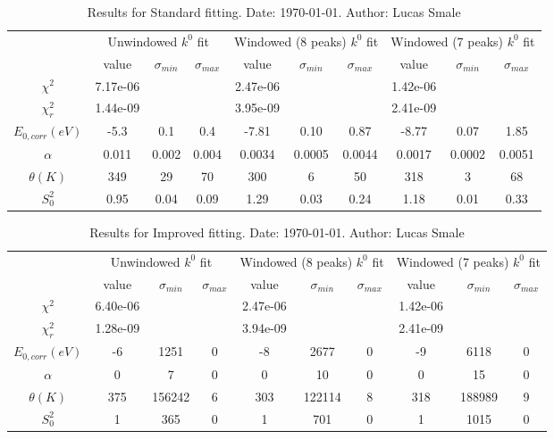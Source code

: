 \documentclass{article}
\begin{document}
\begin{landscape}
\begin{table}[ht]
\centering
\begin{tabular}{c||c|c|c||c|c|c||c|c|c}
\hline
&\multicolumn{3}{|c}{Unwindowed $k^{0}$ fit}&\multicolumn{3}{|c}{Windowed (8 peaks) $k^{0}$ fit}&\multicolumn{3}{|c}{Windowed (7 peaks) $k^{0}$ fit}\\
& value & $\sigma_{min}$ & $\sigma_{max}$& value & $\sigma_{min}$ & $\sigma_{max}$& value & $\sigma_{min}$ & $\sigma_{max}$\\
\hline
$\chi^2$   & 7.17e-06 & & & 2.47e-06 & & & 1.42e-06 & & \\
$\chi^2_r$ & 1.44e-09 & & & 3.95e-09 & & & 2.41e-09 & & \\
\hline
$E_{0,corr} (eV)$& -5.3 & 0.1 & 0.4 & -7.81 & 0.10 & 0.87 & -8.77 & 0.07 & 1.85 \\
$\alpha $       & 0.011 & 0.002 & 0.004 & 0.0034 & 0.0005 & 0.0044 & 0.0017 & 0.0002 & 0.0051 \\
$\theta (K) $   & 349 & 29 & 70 & 300 & 6 & 50 & 318 & 3 & 68 \\
$S^2_{0}$& 0.95 & 0.04 & 0.09 & 1.29 & 0.03 & 0.24 & 1.18 & 0.01 & 0.33 \\
\hline
\end{tabular}
 \caption{Results for Standard fitting. Date: \today. Author: Lucas Smale}
\end{table}
\begin{table}[ht]
\centering
\begin{tabular}{c||c|c|c||c|c|c||c|c|c}
\hline
&\multicolumn{3}{|c}{Unwindowed $k^{0}$ fit}&\multicolumn{3}{|c}{Windowed (8 peaks) $k^{0}$ fit}&\multicolumn{3}{|c}{Windowed (7 peaks) $k^{0}$ fit}\\
& value & $\sigma_{min}$ & $\sigma_{max}$& value & $\sigma_{min}$ & $\sigma_{max}$& value & $\sigma_{min}$ & $\sigma_{max}$\\
\hline
$\chi^2$   & 6.40e-06 & & & 2.47e-06 & & & 1.42e-06 & & \\
$\chi^2_r$ & 1.28e-09 & & & 3.94e-09 & & & 2.41e-09 & & \\
\hline
$E_{0,corr} (eV)$& -6 & 1251 & 0 & -8 & 2677 & 0 & -9 & 6118 & 0 \\
$\alpha $       & 0 & 7 & 0 & 0 & 10 & 0 & 0 & 15 & 0 \\
$\theta (K) $   & 375 & 156242 & 6 & 303 & 122114 & 8 & 318 & 188989 & 9 \\
$S^2_{0}$& 1 & 365 & 0 & 1 & 701 & 0 & 1 & 1015 & 0 \\
\hline
\end{tabular}
 \caption{Results for Improved fitting. Date: \today. Author: Lucas Smale}
\end{table}
\end{landscape}
\end{document}
